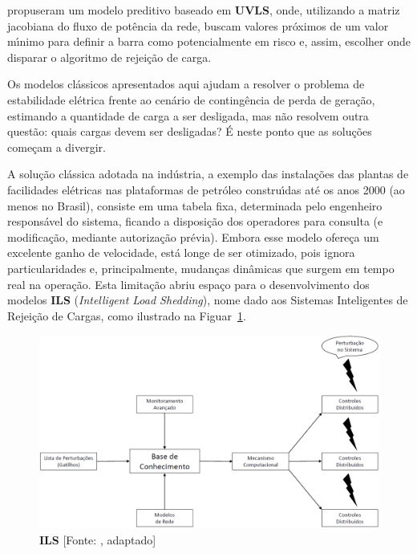 \citeauthor{yu2016liu} propuseram um modelo preditivo baseado em \textbf{UVLS}, onde, utilizando a matriz jacobiana \cite{grainger2016power,monticelli1983fluxo} do fluxo de pot{\^e}ncia da rede, buscam valores pr{\'o}ximos de um valor m{\'\i}nimo para definir a barra como potencialmente em risco e, assim, escolher onde disparar o algoritmo de rejei{\c c}{\~a}o de carga.

Os modelos cl{\'a}ssicos apresentados aqui ajudam a resolver o problema de estabilidade el{\'e}trica frente ao cen{\'a}rio de conting{\^e}ncia de perda de gera{\c c}{\~a}o, estimando a quantidade de carga a ser desligada, mas n{\~a}o resolvem outra quest{\~a}o: quais cargas devem ser desligadas? \'{E} neste ponto que as solu{\c c}{\~o}es come{\c c}am a divergir.

A solu{\c c}{\~a}o cl{\'a}ssica adotada na ind{\'u}stria, a exemplo das instala{\c c}{\~o}es das plantas de facilidades el{\'e}tricas nas plataformas de petr{\'o}leo constru{\'\i}das at{\'e} os anos 2000 (ao menos no Brasil), consiste em uma tabela fixa, determinada pelo engenheiro respons{\'a}vel do sistema, ficando a disposi{\c c}{\~a}o dos operadores para consulta (e modifica{\c c}{\~a}o, mediante autoriza{\c c}{\~a}o pr{\'e}via). Embora esse modelo ofere{\c c}a um excelente ganho de velocidade, est{\'a} longe de ser otimizado, pois ignora particularidades e, principalmente, mudan{\c c}as din{\^a}micas que surgem em tempo real na opera{\c c}{\~a}o. Esta limita{\c c}{\~a}o abriu espa{\c c}o para o desenvolvimento dos modelos \textbf{ILS} (\textit{Intelligent Load Shedding}), nome dado aos Sistemas Inteligentes de Rejei{\c c}{\~a}o de Cargas, como ilustrado na Figuar~\ref{fig:ilsdiag}.

\begin{figure}[!h]
	\centering
	\includegraphics[width=\linewidth]{figuras/ilsdiag}
	\caption[\textbf{ILS}]{\textbf{ILS} [Fonte: \citeauthor{1518342}, adaptado]}
	\label{fig:ilsdiag}
\end{figure}

